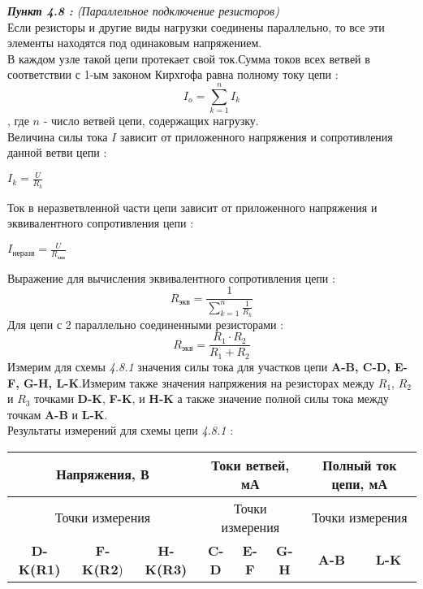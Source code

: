 \documentclass[a4paper,11pt]{article}
\begin{document}
	\newpage 
		\begin{flushleft}
	\textit{\textbf{Пункт 4.8 :} (Параллельное подключение резисторов)}
	\\
	\medskip
	\hangindent=1.5cm  \noindent
	Если резисторы и другие виды нагрузки соединены параллельно, то все эти элементы находятся под одинаковым напряжением.
	\\
	\medskip
	В каждом узле такой цепи протекает свой ток.Сумма токов всех ветвей в соответствии с 1-ым законом Кирхгофа равна полному току цепи :
	\begin{equation}
		I_o = \sum_{k=1}^n I_k 		
	\end{equation}
	, где ${n}$  - число ветвей цепи, содержащих нагрузку.
	\\
	\medskip
	Величина силы тока ${I}$ зависит от приложенного напряжения и сопротивления данной ветви цепи :
	\begin{center}
		${I_k = \frac{U}{R_k}}$
	\end{center}
	Ток в неразветвленной части цепи зависит от приложенного напряжения и эквивалентного сопротивления цепи :
	\begin{center}
		${I_{неразв} = \frac{U}{R_{экв}}}$
	\end{center}
	Выражение для вычисления эквивалентного сопротивления цепи :
	\begin{equation}
		R_{экв}=\frac{1}{\sum_{k=1}^n \frac{1}{R_k}}	
	\end{equation}
	Для цепи с 2 параллельно соединенными резисторами :
	\begin{equation}
		R_{экв}=\frac{R_1 \cdot R_2}{R_1 + R_2} 
	\end{equation} 
	Измерим для схемы \textit{4.8.1} значения силы тока	для участков цепи \textbf{A-B, C-D, E-F, G-H, L-K}.Измерим также значения напряжения на резисторах между ${R_1}$, ${R_2}$ и ${R_3}$ точками \textbf{D-K}, \textbf{F-K}, и \textbf{H-K} а также значение полной силы тока между точкам \textbf{A-B} и \textbf{L-K}.\\
	\medskip
	Результаты измерений для схемы цепи \textit{4.8.1} :
	\begin{center}
		\begin{tabular}{|c|c|c|c|c|c|c|c|}
\hline 
\multicolumn{3}{|c|}{\textbf{Напряжения, В}} & \multicolumn{3}{c|}{\textbf{Токи ветвей, мА}} & \multicolumn{2}{c|}{\textbf{Полный ток цепи, мА}}\tabularnewline
\hline 
\multicolumn{3}{|c|}{Точки измерения} & \multicolumn{3}{c|}{Точки измерения} & \multicolumn{2}{c|}{Точки измерения}\tabularnewline
\hline 
\textbf{D-K(R1)} & \textbf{F-K(R2}) & \textbf{H-K(R3)} & \textbf{C-D} & \textbf{E-F} & \textbf{G-H} & \textbf{A-B} & \textbf{L-K}\tabularnewline

\end{tabular}
\end{center}
\end{flushleft}
\end{document}
